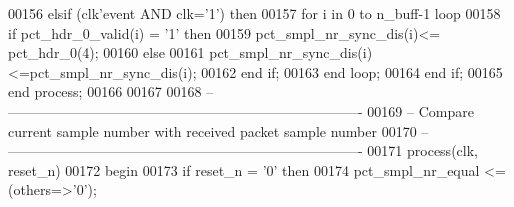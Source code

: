 \begin{DoxyCode}
00156    \textcolor{keywordflow}{elsif} \textcolor{vhdlchar}{(}\textcolor{vhdlchar}{clk}\textcolor{vhdlchar}{'}\textcolor{vhdlkeyword}{event} \textcolor{keywordflow}{AND} \textcolor{vhdlchar}{clk}\textcolor{vhdlchar}{=}\textcolor{vhdlchar}{'}\textcolor{vhdllogic}{}\textcolor{vhdllogic}{1}\textcolor{vhdlchar}{'}\textcolor{vhdlchar}{)} \textcolor{keywordflow}{then} 
00157       \textcolor{keywordflow}{for} \textcolor{vhdlchar}{i} \textcolor{keywordflow}{in} \textcolor{vhdllogic}{}\textcolor{vhdllogic}{0} \textcolor{keywordflow}{to} \textcolor{vhdlchar}{n_buff}\textcolor{vhdlchar}{-}\textcolor{vhdllogic}{}\textcolor{vhdllogic}{1} \textcolor{keywordflow}{loop}
00158          \textcolor{keywordflow}{if} \textcolor{vhdlchar}{pct_hdr_0_valid}\textcolor{vhdlchar}{(}\textcolor{vhdlchar}{i}\textcolor{vhdlchar}{)} \textcolor{vhdlchar}{=} \textcolor{vhdlchar}{'}\textcolor{vhdllogic}{}\textcolor{vhdllogic}{1}\textcolor{vhdlchar}{'} \textcolor{keywordflow}{then} 
00159             \textcolor{vhdlchar}{pct_smpl_nr_sync_dis}\textcolor{vhdlchar}{(}\textcolor{vhdlchar}{i}\textcolor{vhdlchar}{)}\textcolor{vhdlchar}{<=} \textcolor{vhdlchar}{pct_hdr_0}\textcolor{vhdlchar}{(}\textcolor{vhdllogic}{}\textcolor{vhdllogic}{4}\textcolor{vhdlchar}{)};
00160          \textcolor{keywordflow}{else} 
00161             \textcolor{vhdlchar}{pct_smpl_nr_sync_dis}\textcolor{vhdlchar}{(}\textcolor{vhdlchar}{i}\textcolor{vhdlchar}{)}\textcolor{vhdlchar}{<=}\textcolor{vhdlchar}{pct_smpl_nr_sync_dis}\textcolor{vhdlchar}{(}\textcolor{vhdlchar}{i}\textcolor{vhdlchar}{)};
00162          \textcolor{keywordflow}{end} \textcolor{keywordflow}{if};
00163       \textcolor{keywordflow}{end} \textcolor{keywordflow}{loop};
00164    \textcolor{keywordflow}{end} \textcolor{keywordflow}{if};
00165 \textcolor{keywordflow}{end} \textcolor{keywordflow}{process};
00166 
00167 
00168 \textcolor{keyword}{-- ----------------------------------------------------------------------------}
00169 \textcolor{keyword}{-- Compare current sample number with received packet sample number}
00170 \textcolor{keyword}{-- ----------------------------------------------------------------------------}
00171 \textcolor{keywordflow}{process}(clk, reset_n)
00172 \textcolor{vhdlkeyword}{begin}
00173    \textcolor{keywordflow}{if} \textcolor{vhdlchar}{reset_n} \textcolor{vhdlchar}{=} \textcolor{vhdlchar}{'}\textcolor{vhdllogic}{}\textcolor{vhdllogic}{0}\textcolor{vhdlchar}{'} \textcolor{keywordflow}{then} 
00174       \textcolor{vhdlchar}{pct_smpl_nr_equal} \textcolor{vhdlchar}{<=} \textcolor{vhdlchar}{(}\textcolor{keywordflow}{others}\textcolor{vhdlchar}{=}\textcolor{vhdlchar}{>}\textcolor{vhdlchar}{'}\textcolor{vhdllogic}{}\textcolor{vhdllogic}{0}\textcolor{vhdlchar}{'}\textcolor{vhdlchar}{)};

\end{DoxyCode}
